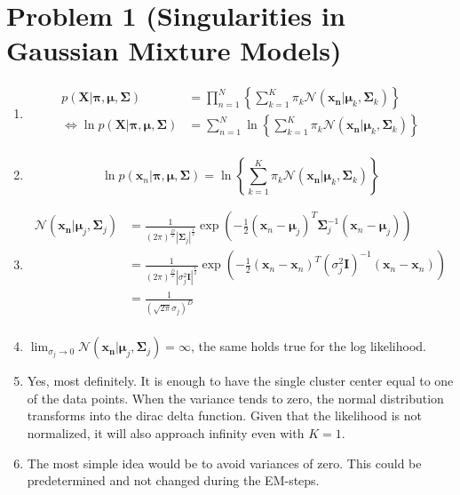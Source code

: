 \documentclass{scrartcl}
\newcommand{\abs}[1]{\left\lvert#1\right\rvert}
\begin{document}
  \section{Problem 1 (Singularities in Gaussian Mixture Models)} %
  \label{sec:problem_1_singularities_in_gaussian_mixture_models_}
    \begin{enumerate}
      \item \begin{align*}
        p(\bm{X} | \bm{\pi}, \bm{\mu}, \bm{\Sigma}) &= \prod_{n=1}^N \left\{ \sum_{k=1}^K
          \pi_k \mathcal{N}(\bm{x_n} | \bm{\mu}_k, \bm{\Sigma}_k) \right\}\\
        \iff \ln p(\bm{X} | \bm{\pi}, \bm{\mu}, \bm{\Sigma}) &= \sum_{n=1}^N
          \ln\left\{\sum_{k=1}^{K} \pi_k \mathcal{N}(\bm{x_n} | \bm{\mu}_k, \bm{\Sigma}_k)\right\} \\
      \end{align*}
      \item \[
        \ln p(\bm{x}_n | \bm{\pi}, \bm{\mu}, \bm{\Sigma}) =
          \ln\left\{\sum_{k=1}^{K} \pi_k \mathcal{N}(\bm{x_n} | \bm{\mu}_k, \bm{\Sigma}_k)\right\}
      \]
      \item
      \begin{align*}
        \mathcal{N}(\bm{x_n} | \bm{\mu}_j, \bm{\Sigma}_{j})
          &= \frac{1}{(2 \pi)^{\frac{D}{2}} \abs{\bm{\Sigma}_j}^{\frac{1}{2}}}
          \exp \left( -\frac{1}{2} (\bm{x}_n - \bm{\mu}_j)^T \bm{\Sigma}_{j}^{-1} (\bm{x}_n - \bm{\mu}_j) \right) \\
          &= \frac{1}{(2 \pi)^{\frac{D}{2}} \abs{\sigma_j^2\bm{I}}^{\frac{1}{2}}}
          \exp \left( -\frac{1}{2} (\bm{x}_n - \bm{x}_n)^T (\sigma_j^2\bm{I})^{-1} (\bm{x}_n - \bm{x}_n) \right) \\
          &= \frac{1}{(\sqrt{2 \pi} \sigma_j)^{D}} \\
      \end{align*}
      \item $
        \lim_{\sigma_j \to 0} \mathcal{N}(\bm{x_n} | \bm{\mu}_j, \bm{\Sigma}_{j}) = \infty
      $, the same holds true for the log likelihood.

      \item Yes, most definitely. It is enough to have the single cluster center
        equal to one of the data points. When the variance tends to zero, the
        normal distribution transforms into the dirac delta function. Given that
        the likelihood is not normalized, it will also approach infinity even
        with $K = 1$.

      \item The most simple idea would be to avoid variances of zero. This could
        be predetermined and not changed during the EM-steps.
    \end{enumerate}
\end{document}
